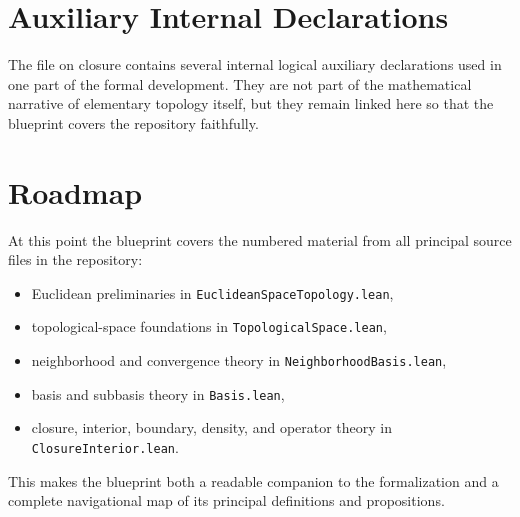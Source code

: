 \chapter{Auxiliary Internal Declarations}

\begin{remark}\label{rem:internal-auxiliary-closure}
\leanok
The file on closure contains several internal logical auxiliary declarations used in one part of the formal development. They are not part of the mathematical narrative of elementary topology itself, but they remain linked here so that the blueprint covers the repository faithfully.
\end{remark}

\chapter{Roadmap}

At this point the blueprint covers the numbered material from all principal source files in the repository:
\begin{itemize}
  \item Euclidean preliminaries in \texttt{EuclideanSpaceTopology.lean},
  \item topological-space foundations in \texttt{TopologicalSpace.lean},
  \item neighborhood and convergence theory in \texttt{NeighborhoodBasis.lean},
  \item basis and subbasis theory in \texttt{Basis.lean},
  \item closure, interior, boundary, density, and operator theory in \texttt{ClosureInterior.lean}.
\end{itemize}

This makes the blueprint both a readable companion to the formalization and a complete navigational map of its principal definitions and propositions.
